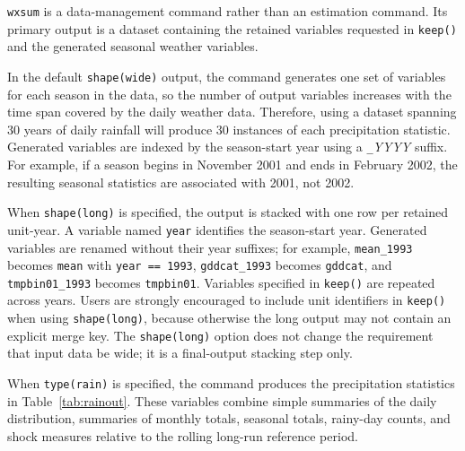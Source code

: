 \texttt{wxsum} is a data-management command rather than an estimation command. Its primary output is a dataset containing the retained variables requested in \texttt{keep()} and the generated seasonal weather variables.

In the default \texttt{shape(wide)} output, the command generates one set of variables for each season in the data, so the number of output variables increases with the time span covered by the daily weather data. Therefore, using a dataset spanning 30 years of daily rainfall will produce 30 instances of each precipitation statistic. Generated variables are indexed by the season-start year using a \texttt{\_}\textit{YYYY} suffix. For example, if a season begins in November 2001 and ends in February 2002, the resulting seasonal statistics are associated with 2001, not 2002.

When \texttt{shape(long)} is specified, the output is stacked with one row per retained unit-year. A variable named \texttt{year} identifies the season-start year. Generated variables are renamed without their year suffixes; for example, \texttt{mean\_1993} becomes \texttt{mean} with \texttt{year == 1993}, \texttt{gddcat\_1993} becomes \texttt{gddcat}, and \texttt{tmpbin01\_1993} becomes \texttt{tmpbin01}. Variables specified in \texttt{keep()} are repeated across years. Users are strongly encouraged to include unit identifiers in \texttt{keep()} when using \texttt{shape(long)}, because otherwise the long output may not contain an explicit merge key. The \texttt{shape(long)} option does not change the requirement that input data be wide; it is a final-output stacking step only.

When \texttt{type(rain)} is specified, the command produces the precipitation statistics in Table~\ref{tab:rainout}. These variables combine simple summaries of the daily distribution, summaries of monthly totals, seasonal totals, rainy-day counts, and shock measures relative to the rolling long-run reference period.

